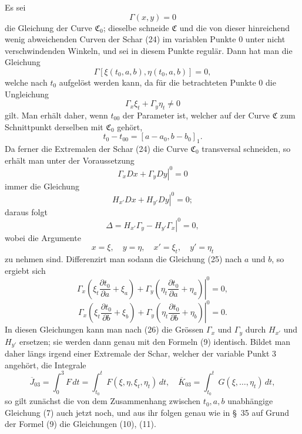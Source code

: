 \documentclass[11pt,a4paper,leqno]{article}
\begin{document}
Es sei
\[
\Gamma(x,y)=0
\]
die Gleichung der Curve $\mathfrak{C}_0$; dieselbe schneide $\mathfrak{C}$ und die von dieser hinreichend wenig abweichenden Curven der Schar (24) im variablen Punkte 0 unter nicht verschwindenden Winkeln, und sei in diesem Punkte regulär. Dann hat man die Gleichung
\begin{equation}\tag{25}
\Gamma[\xi(t_0,a,b),\eta(t_0,a,b)]=0,
\end{equation}
welche nach $t_0$ aufgelöst werden kann, da für die betrachteten Punkte 0 die Ungleichung
\[
\Gamma_x\xi_t+\Gamma_y\eta_t\neq0
\]
gilt. Man erhält daher, wenn $t_{00}$ der Parameter ist, welcher auf der Curve $\mathfrak{C}$ zum Schnittpunkt derselben mit $\mathfrak{C}_0$ gehört,
\[
t_0-t_{00}=[a-a_0,b-b_0]_1.
\]
Da ferner die Extremalen der Schar (24) die Curve $\mathfrak{C}_0$ transversal schneiden, so erhält man unter der Voraussetzung
\[
\left.\Gamma_xDx+\Gamma_yDy\right|^0=0
\]
immer die Gleichung
\[
\left.H_{x'}Dx+H_{y'}Dy\right|^0=0;
\]
daraus folgt
\begin{equation}\tag{26}
\left.\Delta=H_{x'}\Gamma_y-H_{y'}\Gamma_x\right|^0=0,
\end{equation}
wobei die Argumente
\begin{equation}\tag{27}
x=\xi,\quad y=\eta,\quad x'=\xi_t,\quad y'=\eta_t
\end{equation}
zu nehmen sind. Differenzirt man sodann die Gleichung (25) nach $a$ und $b$, so ergiebt sich
\[
\left.\Gamma_x\left(\xi_t\frac{\partial t_0}{\partial a}+\xi_a\right)+\Gamma_y\left(\eta_t\frac{\partial t_0}{\partial a}+\eta_a\right)\right|^0=0,
\]
\[
\left.\Gamma_x\left(\xi_t\frac{\partial t_0}{\partial b}+\xi_b\right)+\Gamma_y\left(\eta_t\frac{\partial t_0}{\partial b}+\eta_b\right)\right|^0=0.
\]
In diesen Gleichungen kann man nach (26) die Grössen $\Gamma_x$ und $\Gamma_y$ durch $H_{x'}$ und $H_{y'}$ ersetzen; sie werden dann genau mit den Formeln (9) identisch. Bildet man daher längs irgend einer Extremale der Schar, welcher der variable Punkt 3 angehört, die Integrale
\[
\overline{J}_{03}=\int_0^3 F\,dt=\int_{t_0}^{t}F(\xi,\eta,\xi_t,\eta_t)\,dt,\quad
\overline{K}_{03}=\int_{t_0}^{t}G(\xi,\ldots,\eta_t)\,dt,
\]
so gilt zunächst die von dem Zusammenhang zwischen $t_0,a,b$ unabhängige Gleichung (7) auch jetzt noch, und aus ihr folgen
genau wie in \S~35 auf Grund der Formel (9) die Gleichungen (10), (11).
\end{document}
